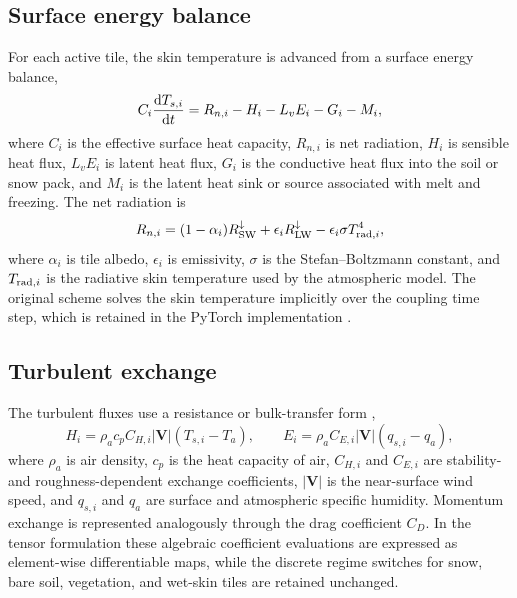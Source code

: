 \subsection{Surface energy balance}

For each active tile, the skin temperature is advanced from a surface energy
balance,
\begin{equation}
  C_i \frac{{\rm d}T_{s,i}}{{\rm d}t}
  = R_{n,i} - H_i - L_v E_i - G_i - M_i ,
\label{eq:model-seb}
\end{equation}
where $C_i$ is the effective surface heat capacity, $R_{n,i}$ is net radiation,
$H_i$ is sensible heat flux, $L_vE_i$ is latent heat flux, $G_i$ is the
conductive heat flux into the soil or snow pack, and $M_i$ is the latent heat
sink or source associated with melt and freezing.  The net radiation is
\begin{equation}
  R_{n,i} = (1-\alpha_i)R_{\rm SW}^{\downarrow}
  + \epsilon_i R_{\rm LW}^{\downarrow}
  - \epsilon_i \sigma T_{{\rm rad},i}^{4},
\label{eq:model-rn}
\end{equation}
where $\alpha_i$ is tile albedo, $\epsilon_i$ is emissivity, $\sigma$ is the
Stefan--Boltzmann constant, and $T_{{\rm rad},i}$ is the radiative skin
temperature used by the atmospheric model.  The original scheme solves the skin
temperature implicitly over the coupling time step, which is retained in the
PyTorch implementation \citep{ViterboBeljaars1995,ECMWFIFSPartIV}.

\subsection{Turbulent exchange}

The turbulent fluxes use a resistance or bulk-transfer form
\citep{Louis1979,ECMWFIFSPartIV},
\begin{equation}
  H_i = \rho_a c_p C_{H,i} |\mathbf{V}|(T_{s,i}-T_a),
  \qquad
  E_i = \rho_a C_{E,i} |\mathbf{V}|(q_{s,i}-q_a),
\label{eq:model-flux}
\end{equation}
where $\rho_a$ is air density, $c_p$ is the heat capacity of air, $C_{H,i}$ and
$C_{E,i}$ are stability- and roughness-dependent exchange coefficients,
$|\mathbf{V}|$ is the near-surface wind speed, and $q_{s,i}$ and $q_a$ are
surface and atmospheric specific humidity.  Momentum exchange is represented
analogously through the drag coefficient $C_D$.  In the tensor formulation
these algebraic coefficient evaluations are expressed as element-wise
differentiable maps, while the discrete regime switches for snow, bare soil,
vegetation, and wet-skin tiles are retained unchanged.

